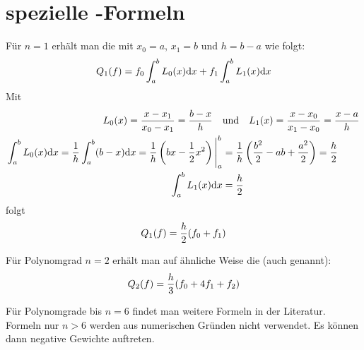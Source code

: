 \section{spezielle -Formeln}

Für $n=1$ erhält man die  mit $x_0=a$, $x_1=b$ und $h=b-a$ wie folgt:
\begin{align}
	Q_1(f)=f_0\int_a^b L_0(x)\mathrm{d} x+f_1\int_a^b L_1(x)\mathrm{d} x\notag
\end{align}
Mit 
\begin{align}
	L_0(x)=\frac{x-x_1}{x_0-x_1}=\frac{b-x}{h}\quad&\text{und}\quad L_1(x)=\frac{x-x_0}{x_1-x_0} = \frac{x-a}{h} \notag \\
	\int_a^b L_0(x)\mathrm{d} x=\frac{1}{h}\int_a^b (b-x)\mathrm{d} x=\frac{1}{h}\left( bx-\frac{1}{2}x^2\right)\Bigg|_a^b&=\frac{1}{h} \left( \frac{b^2}{2}-ab+\frac{a^2}{2}\right) =\frac{h}{2}\notag \\
	\int_a^b L_1(x)\mathrm{d} x&=\frac{h}{2}\notag
\end{align}
folgt
\begin{align}
	Q_1(f)=\frac{h}{2}(f_0+f_1)\notag
\end{align}

Für Polynomgrad $n=2$ erhält man auf ähnliche Weise die  (auch  genannt):
\begin{align}
	Q_2(f)=\frac{h}{3}(f_0+4f_1+f_2)\notag
\end{align}

Für Polynomgrade bis $n=6$ findet man weitere Formeln in der Literatur. Formeln nur $n>6$ werden aus numerischen Gründen nicht verwendet. Es können dann negative Gewichte auftreten.

